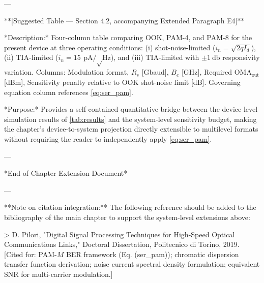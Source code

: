---

**[Suggested Table — Section 4.2, accompanying Extended Paragraph E4]**

*Description:* Four-column table comparing OOK, PAM-4, and PAM-8 for the present device at three operating conditions: (i) shot-noise-limited ($i_n = \sqrt{2qI_d}$), (ii) TIA-limited ($i_n = \SI{15}{\pico\ampere\per\sqrt\hertz}$), and (iii) TIA-limited with $\pm\SI{1}{\decibel}$ responsivity variation. Columns: Modulation format, $R_s$ [Gbaud], $B_e$ [GHz], Required $\mathrm{OMA}_\mathrm{out}$ [dBm], Sensitivity penalty relative to OOK shot-noise limit [dB]. Governing equation column references \cref{eq:ser_pam}.

*Purpose:* Provides a self-contained quantitative bridge between the device-level simulation results of \cref{tab:results} and the system-level sensitivity budget, making the chapter's device-to-system projection directly extensible to multilevel formats without requiring the reader to independently apply \cref{eq:ser_pam}.

---

*End of Chapter Extension Document*

---

**Note on citation integration:** The following reference should be added to the bibliography of the main chapter to support the system-level extensions above:

> D. Pilori, "Digital Signal Processing Techniques for High-Speed Optical Communications Links," Doctoral Dissertation, Politecnico di Torino, 2019. [Cited for: PAM-$M$ BER framework (Eq. (ser\_pam)); chromatic dispersion transfer function derivation; noise current spectral density formulation; equivalent SNR for multi-carrier modulation.]